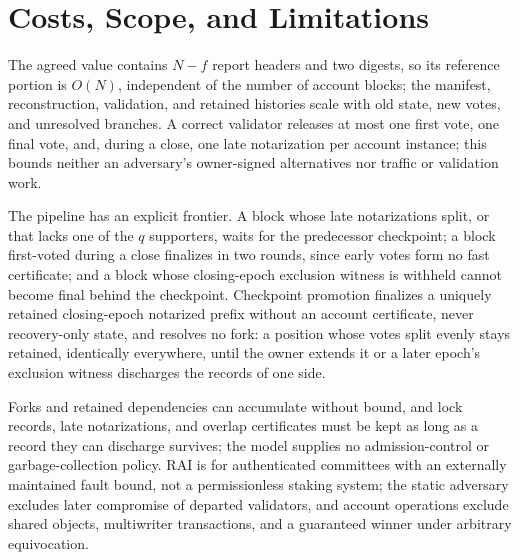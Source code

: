 \section{Costs, Scope, and Limitations}
\label{sec:costs}
The agreed value contains $N-f$ report headers and two digests, so its reference portion is $O(N)$, independent of the number of account blocks; the manifest, reconstruction, validation, and retained histories scale with old state, new votes, and unresolved branches. A correct validator releases at most one first vote, one final vote, and, during a close, one late notarization per account instance; this bounds neither an adversary's owner-signed alternatives nor traffic or validation work.

The pipeline has an explicit frontier. A block whose late notarizations split, or that lacks one of the $q$ supporters, waits for the predecessor checkpoint; a block first-voted during a close finalizes in two rounds, since early votes form no fast certificate; and a block whose closing-epoch exclusion witness is withheld cannot become final behind the checkpoint. Checkpoint promotion finalizes a uniquely retained closing-epoch notarized prefix without an account certificate, never recovery-only state, and resolves no fork: a position whose votes split evenly stays retained, identically everywhere, until the owner extends it or a later epoch's exclusion witness discharges the records of one side.

Forks and retained dependencies can accumulate without bound, and lock records, late notarizations, and overlap certificates must be kept as long as a record they can discharge survives; the model supplies no admission-control or garbage-collection policy. RAI is for authenticated committees with an externally maintained fault bound, not a permissionless staking system; the static adversary excludes later compromise of departed validators, and account operations exclude shared objects, multiwriter transactions, and a guaranteed winner under arbitrary equivocation.

